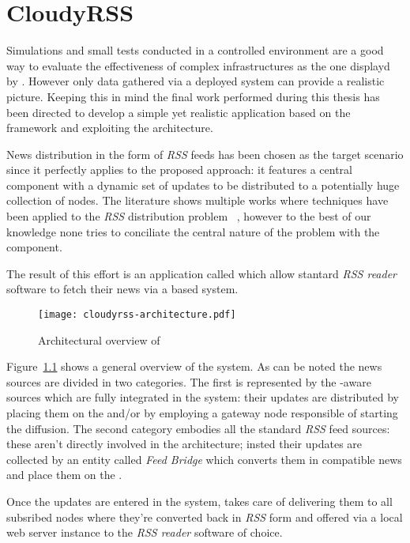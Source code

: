\chapter{CloudyRSS}
Simulations and small tests conducted in a controlled environment are a
good way to evaluate the effectiveness of complex infrastructures as the
one displayd by \cloudcast. However only data gathered via a
deployed system can provide a realistic picture.
Keeping this in mind the final work performed during this thesis
has been directed to develop a simple yet realistic application based
on the \cloudypeer framework and exploiting the \cloudcast
architecture.

News distribution in the form of \textit{RSS} feeds has been chosen as
the target scenario since it perfectly applies to the proposed
approach: it features a central component with a dynamic set of
updates to be distributed to a potentially huge collection of nodes.
The literature shows multiple works where \ptop techniques
have been applied to the \textit{RSS} distribution
problem~\cite{P2PFeedDelivery}
\cite{AttackResilientP2PFeedDissemination}
\cite{SimpleSecurityP2PFeedDissemination}, however to the best of our
knowledge none tries to conciliate the central nature of the problem
with the \ptop component.

The result of this effort is an application called \cloudyrss which
allow stantard \textit{RSS reader} software to fetch their news via a
\cloudcast based system.

\begin{figure}[h!]
  \texttt{[image: cloudyrss-architecture.pdf]}
  \caption{Architectural overview of \cloudyrss}
  \label{fig:cloudyrss-architecture}
\end{figure}

Figure~\ref{fig:cloudyrss-architecture} shows a general overview of
the system. As can be noted the news sources are divided in two
categories. The first is represented by the \cloudyrss-aware sources
which are fully integrated in the system: their updates are distributed
by placing them on the \cloud and/or by employing a gateway node
responsible of starting the \epidemic diffusion.
The second category embodies all the standard \textit{RSS} feed
sources: these aren't directly involved in the architecture; insted their
updates are collected by an entity called \textit{Feed
  Bridge} which converts them in \cloudyrss compatible news and place
them on the \cloud.

Once the updates are entered in the system, \cloudcast takes care of
delivering them to all subsribed nodes where they're converted back in
\textit{RSS} form and offered via a local web server instance to the
\textit{RSS reader} software of choice.

